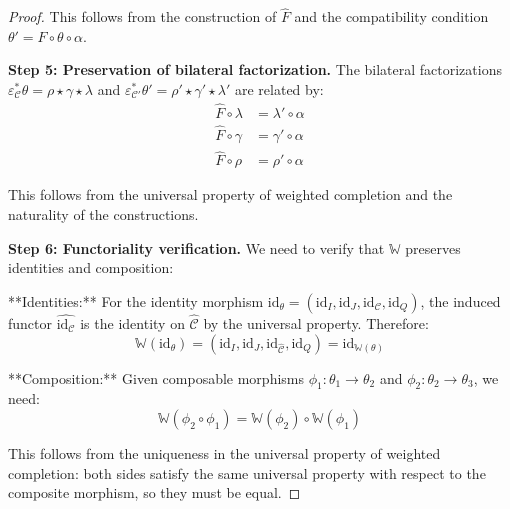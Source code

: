 \documentclass[11pt]{article}
\theoremstyle{plain}
\theoremstyle{definition}
\theoremstyle{remark}
\newcommand{\C}{\mathcal{C}}
\newcommand{\wh}[1]{\widehat{#1}}
\begin{document}
\begin{proof}
This follows from the construction of $\wh{F}$ and the compatibility condition $\theta' = F \circ \theta \circ \alpha$.

\textbf{Step 5: Preservation of bilateral factorization.}
The bilateral factorizations $\varepsilon_\C^* \theta = \rho \star \gamma \star \lambda$ and $\varepsilon_{\C'}^* \theta' = \rho' \star \gamma' \star \lambda'$ are related by:
\begin{align}
\wh{F} \circ \lambda &= \lambda' \circ \alpha \\
\wh{F} \circ \gamma &= \gamma' \circ \alpha \\
\wh{F} \circ \rho &= \rho' \circ \alpha
\end{align}

This follows from the universal property of weighted completion and the naturality of the constructions.

\textbf{Step 6: Functoriality verification.}
We need to verify that $\mathbb{W}$ preserves identities and composition:

**Identities:** For the identity morphism $\text{id}_\theta = (\text{id}_I, \text{id}_J, \text{id}_\C, \text{id}_Q)$, the induced functor $\wh{\text{id}_\C}$ is the identity on $\wh{\C}$ by the universal property. Therefore:
$$\mathbb{W}(\text{id}_\theta) = (\text{id}_I, \text{id}_J, \text{id}_{\wh{\C}}, \text{id}_Q) = \text{id}_{\mathbb{W}(\theta)}$$

**Composition:** Given composable morphisms $\phi_1 : \theta_1 \to \theta_2$ and $\phi_2 : \theta_2 \to \theta_3$, we need:
$$\mathbb{W}(\phi_2 \circ \phi_1) = \mathbb{W}(\phi_2) \circ \mathbb{W}(\phi_1)$$

This follows from the uniqueness in the universal property of weighted completion: both sides satisfy the same universal property with respect to the composite morphism, so they must be equal.
\end{proof}
\end{document}
